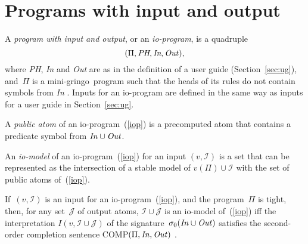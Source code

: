 \documentclass{new_tlp}
\def\beq{\begin{equation}}
\def\eeq#1{\label{#1}\end{equation}}
\def\gringo{{\sc gringo}}
\newcommand{\I}{\mathcal{I}}
\newcommand{\J}{\mathcal{J}}
\begin{document}
\section{Programs with input and output} \label{appc}

A \emph{program with input and output}, or an \emph{io-program},
is a quadruple
\beq
(\Pi,\emph{PH},\emph{In},\emph{Out\/}),
\eeq{iop}
where \emph{PH}, \emph{In} and \emph{Out} are as in the definition of
a user guide (Section~\ref{sec:ug}), and~$\Pi$ is a mini-\gringo\ program
such that the heads of its rules do not contain symbols from \emph{In}
\cite[Section~5.1]{fan20}.  Inputs for an io-program are defined in the same
way as inputs for a user guide in Section~\ref{sec:ug}.

A \emph{public atom} of an io-program~(\ref{iop}) is a precomputed atom
that contains a predicate symbol from $\emph{In\/}\cup\emph{Out\/}$.

An \emph{io-model} of an io-program~(\ref{iop}) for an input $(v,\I)$ is
a set that can be represented as the intersection of a stable model
of $v(\Pi)\cup\I$ with the set of public atoms of~(\ref{iop}).

If~$(v,\I)$ is an input for an io-program~(\ref{iop}), and the program~$\Pi$
is tight, then, for any set~$\J$ of output atoms, $\I\cup\J$ is an io-model
of~(\ref{iop}) iff the interpretation $I(v,\I\cup\J)$ of the
signature~$\sigma_0(\emph{In\/}\cup\emph{Out\/})$ satisfies the
second-order completion sentence COMP$(\Pi,\emph{In\/},\emph{Out\/})$
\cite[Theorem~2]{fan20}.
\end{document}
